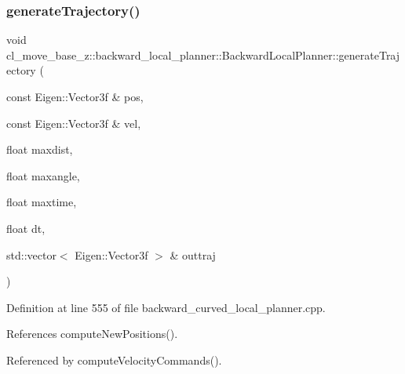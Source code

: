 \subsubsection{\texorpdfstring{generate\+Trajectory()}{generateTrajectory()}}
{\footnotesize\ttfamily void cl\+\_\+move\+\_\+base\+\_\+z\+::backward\+\_\+local\+\_\+planner\+::\+Backward\+Local\+Planner\+::generate\+Trajectory (\begin{DoxyParamCaption}\item[{const Eigen\+::\+Vector3f \&}]{pos,  }\item[{const Eigen\+::\+Vector3f \&}]{vel,  }\item[{float}]{maxdist,  }\item[{float}]{maxangle,  }\item[{float}]{maxtime,  }\item[{float}]{dt,  }\item[{std\+::vector$<$ Eigen\+::\+Vector3f $>$ \&}]{outtraj }\end{DoxyParamCaption})\hspace{0.3cm}{\ttfamily [private]}}



Definition at line 555 of file backward\+\_\+curved\+\_\+local\+\_\+planner.\+cpp.



References compute\+New\+Positions().



Referenced by compute\+Velocity\+Commands().


